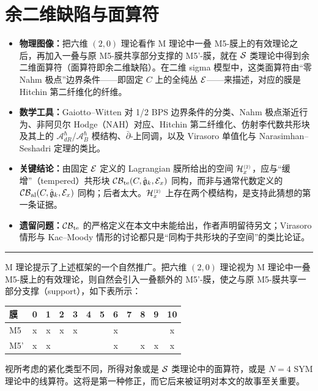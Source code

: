 \section{余二维缺陷与面算符}\label{codim2}

\begin{keytakeaways}
\begin{itemize}
  \item \textbf{物理图像：}把六维 $(2,0)$ 理论看作 M 理论中一叠 M5-膜上的有效理论之后，再加入一叠与原 M5-膜共享部分支撑的 M5'-膜，就在 $\mathcal{S}$ 类理论中得到余二维面算符（面算符即余二维缺陷）。在二维 sigma 模型中，这类面算符由“零 Nahm 极点”边界条件——即固定 $C$ 上的全纯丛 $\mathcal{E}$——来描述，对应的膜是 Hitchin 第二纤维化的纤维。
  \item \textbf{数学工具：}Gaiotto--Witten 对 1/2 BPS 边界条件的分类、Nahm 极点渐近行为、非阿贝尔 Hodge（NAH）对应、Hitchin 第二纤维化、仿射李代数共形块及其上的 $\mathcal{A}_{dR}^{\hbar}$/$\mathcal{A}_{B}^{\hbar}$ 模结构、$\bar\partial$-上同调，以及 Virasoro 单值化与 Narasimhan--Seshadri 定理的类比。
  \item \textbf{关键结论：}由固定 $\mathcal{E}$ 定义的 Lagrangian 膜所给出的空间 $\mathcal{H}^{\scriptscriptstyle (2)}_x$，应与“缓增”（tempered）共形块 $\mathcal{CB}_{\rm te}(C,\hat{\mathfrak{g}}_k,\mathcal{E}_x)$ 同构，而非与通常代数定义的 $\mathcal{CB}_{\rm al}(C,\hat{\mathfrak{g}}_k,\mathcal{E}_x)$ 同构；后者太大。$\mathcal{H}^{\scriptscriptstyle (2)}_x$ 上存在两个模结构，是支持此猜想的第一条证据。
  \item \textbf{遗留问题：}$\mathcal{CB}_{\rm te}$ 的严格定义在本文中未能给出，作者声明留待另文；Virasoro 情形与 Kac--Moody 情形的讨论都只是“同构于共形块的子空间”的类比论证。
\end{itemize}
\end{keytakeaways}

\bigskip
\noindent\rule{\textwidth}{0.6pt}
\bigskip

M 理论提示了上述框架的一个自然推广。把六维 $(2,0)$ 理论视为 M 理论中一叠 M5-膜上的有效理论，则自然会引入一叠额外的 M5'-膜，使之与原 M5-膜共享一部分支撑（support），如下表所示：
\begin{center}
\begin{tabular}{l || c|c|c|c|c|c|c|c|c|c|c}
膜 & 0 & 1 & 2 & 3 & 4 & 5 & 6 & 7 & 8 & 9 & 10 \\ \hline\hline
M5  & x & x & x & x &   &   & x &   &   &   & x  \\
M5' & x & x &   &   &   &   & x &   & x & x & x \\
\end{tabular}
\end{center}
视所考虑的紧化类型不同，所得对象或是 $\mathcal{S}$ 类理论中的面算符，或是 $N=4$ SYM 理论中的线算符。这将是第一种修正，而它后来被证明对本文的故事至关重要。

